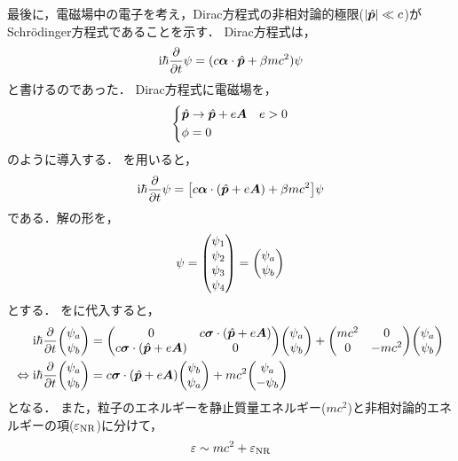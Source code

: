 \documentclass{report}
\begin{document}
  最後に，電磁場中の電子を考え，Dirac方程式の非相対論的極限($\abs{\hat{\bm{p}}} \ll c$)がSchrödinger方程式であることを示す．
  Dirac方程式は，
  \begin{align}
    \mathrm{i}\hbar\pdv{t}\psi = (c \bm{\alpha}\cdot \hat{\bm{p}} + \beta mc^2)\psi
  \end{align}
  と書けるのであった．
  Dirac方程式に電磁場を，
  \begin{align}
    \begin{dcases}
      \hat{\bm{p}} \to \hat{\bm{p}} + e\bm{A} & e > 0 \label{how-to-introduce-emfield}\\
      \phi = 0
    \end{dcases}
  \end{align}
  のように導入する．
  を用いると，
  \begin{align}
    \mathrm{i}\hbar\pdv{t}\psi = \qty[c \bm{\alpha}\cdot \qty(\hat{\bm{p}} + e\bm{A}) + \beta mc^2]\psi \label{dirac-eq-in-emfield}
  \end{align}
  である．解の形を，
  \begin{align}
    \psi = \mqty(\psi_1 \\ \psi_2 \\ \psi_3 \\ \psi_4) =
    \mqty(\psi_a \\ \psi_b)\label{psi-change-form}
  \end{align}
  とする．
  をに代入すると，
  \begin{align}
    \i\hbar\pdv{t}\mqty(\psi_a\\ \psi_b) &= \mqty(
      0 & c\bm{\sigma} \cdot (\hat{\bm{p}} + e \bm{A})\\
      c\bm{\sigma} \cdot (\hat{\bm{p}} + e \bm{A}) & 0
    )\mqty(\psi_a \\ \psi_b) + \mqty(
      mc^2 & 0 \\
      0 & -mc^2
    )\mqty(\psi_a\\ \psi_b)\\
    \Leftrightarrow \i\hbar\pdv{t}\mqty(\psi_a\\ \psi_b) &= c\bm{\sigma}\cdot(\hat{\bm{p}} + e\bm{A})\mqty(\psi_b \\ \psi_a) + mc^2\mqty(\psi_a \\ -\psi_b)\label{psi-change-form-2}
  \end{align}
  となる．
  また，粒子のエネルギーを静止質量エネルギー($mc^2$)と非相対論的エネルギーの項($\varepsilon_{\mathrm{NR}}$)に分けて，
  \begin{align}
    \varepsilon \sim mc^2 + \varepsilon_{\mathrm{NR}}
  \end{align}
\end{document}
